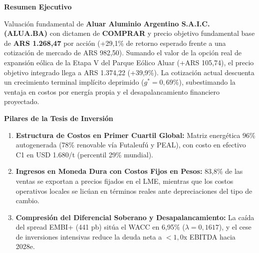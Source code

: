 \documentclass[11pt,a4paper]{article}
\newcommand{\coverheading}[1]{{\georgiahead\bfseries\color{gsnavy}\normalsize #1}\par\vspace{2pt}}
\begin{document}
\noindent
\begin{minipage}[t]{0.53\textwidth}
    \coverheading{Resumen Ejecutivo}
    {\small Valuación fundamental de \textbf{Aluar Aluminio Argentino S.A.I.C. (ALUA.BA)} con dictamen de \textbf{COMPRAR} y precio objetivo fundamental base de \textbf{ARS 1.268,47} por acción (+29,1\% de retorno esperado frente a una cotización de mercado de ARS 982,50). Sumando el valor de la opción real de expansión eólica de la Etapa V del Parque Eólico Aluar (+ARS 105,74), el precio objetivo integrado llega a ARS 1.374,22 (+39,9\%). La cotización actual descuenta un crecimiento terminal implícito deprimido ($g^* = 0,69\%$), subestimando la ventaja en costos por energía propia y el desapalancamiento financiero proyectado.}

    \vspace{0.15cm}
    \coverheading{Pilares de la Tesis de Inversión}
    \begin{enumerate}
        \setlength{\itemsep}{2pt}
        \item \textbf{Estructura de Costos en Primer Cuartil Global:} Matriz energética 96\% autogenerada (78\% renovable vía Futaleufú y PEAL), con costo en efectivo C1 en USD 1.680/t (percentil 29\% mundial).
        \item \textbf{Ingresos en Moneda Dura con Costos Fijos en Pesos:} 83,8\% de las ventas se exportan a precios fijados en el LME, mientras que los costos operativos locales se licúan en términos reales ante depreciaciones del tipo de cambio.
        \item \textbf{Compresión del Diferencial Soberano y Desapalancamiento:} La caída del spread EMBI+ (441 pb) sitúa el WACC en 6,95\% ($\lambda=0,1617$), y el cese de inversiones intensivas reduce la deuda neta a $<1,0\text{x}$ EBITDA hacia 2028e.
    \end{enumerate}
\end{minipage}%
\hfill
\end{document}
